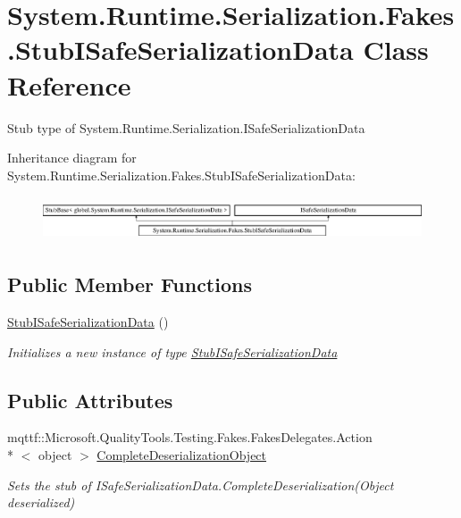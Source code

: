 \hypertarget{class_system_1_1_runtime_1_1_serialization_1_1_fakes_1_1_stub_i_safe_serialization_data}{\section{System.\-Runtime.\-Serialization.\-Fakes.\-Stub\-I\-Safe\-Serialization\-Data Class Reference}
\label{class_system_1_1_runtime_1_1_serialization_1_1_fakes_1_1_stub_i_safe_serialization_data}
}


Stub type of System.\-Runtime.\-Serialization.\-I\-Safe\-Serialization\-Data 


Inheritance diagram for System.\-Runtime.\-Serialization.\-Fakes.\-Stub\-I\-Safe\-Serialization\-Data\-:\begin{figure}[H]
\begin{center}
\leavevmode
\includegraphics[height=1.320755cm]{class_system_1_1_runtime_1_1_serialization_1_1_fakes_1_1_stub_i_safe_serialization_data}
\end{center}
\end{figure}
\subsection*{Public Member Functions}
\begin{DoxyCompactItemize}
\item 
\hyperlink{class_system_1_1_runtime_1_1_serialization_1_1_fakes_1_1_stub_i_safe_serialization_data_a608cbad9d4fe780103b4132779ba5257}{Stub\-I\-Safe\-Serialization\-Data} ()
\begin{DoxyCompactList}\small\item\em Initializes a new instance of type \hyperlink{class_system_1_1_runtime_1_1_serialization_1_1_fakes_1_1_stub_i_safe_serialization_data}{Stub\-I\-Safe\-Serialization\-Data}\end{DoxyCompactList}\end{DoxyCompactItemize}
\subsection*{Public Attributes}
\begin{DoxyCompactItemize}
\item 
mqttf\-::\-Microsoft.\-Quality\-Tools.\-Testing.\-Fakes.\-Fakes\-Delegates.\-Action\\*
$<$ object $>$ \hyperlink{class_system_1_1_runtime_1_1_serialization_1_1_fakes_1_1_stub_i_safe_serialization_data_a80e7eab771b8325866466276cc1c96be}{Complete\-Deserialization\-Object}
\begin{DoxyCompactList}\small\item\em Sets the stub of I\-Safe\-Serialization\-Data.\-Complete\-Deserialization(\-Object deserialized)\end{DoxyCompactList}\end{DoxyCompactItemize}


